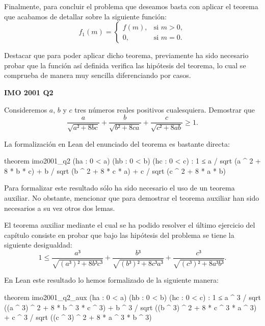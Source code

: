Finalmente, para concluir el problema que deseamos basta con aplicar el
teorema que acabamos de detallar sobre la siguiente función:
 \begin{equation}
    f_1(m)=\left\lbrace\begin{array}{ll}
                         f(m), & \text{si } m>0, \\
                         0, & \text{si } m=0.
                       \end{array}\right.
\end{equation}

Destacar que para poder aplicar dicho teorema, previamente ha sido
necesario probar que la función así definida verifica las hipótesis del
teorema, lo cual se comprueba de manera muy sencilla diferenciando por
casos.

\textbf{IMO 2001 Q2}

\noindent
Consideremos \(a\), \(b\) y \(c\) tres números reales positivos
cualesquiera. Demostrar que
\begin{equation}\label{introq2}
  \frac{a}{\sqrt{a²+8bc}} +
  \frac{b}{\sqrt{b²+8ca}} +
  \frac{c}{\sqrt{c²+8ab}} ≥ 1.
\end{equation}

La formalización en Lean del enunciado del teorema es bastante directa:

\begin{leancode}
theorem imo2001_q2
  (ha : 0 < a)
  (hb : 0 < b)
  (hc : 0 < c)
  : 1 ≤ a / sqrt (a ^ 2 + 8 * b * c) +
        b / sqrt (b ^ 2 + 8 * c * a) +
        c / sqrt (c ^ 2 + 8 * a * b)
\end{leancode}

Para formalizar este resultado sólo ha sido necesario el uso de un
teorema auxiliar. No obstante, mencionar que para demostrar el teorema
auxiliar han sido necesarios a su vez otros dos lemas.

El teorema auxiliar mediante el cual se ha podido resolver el último
ejercicio del capítulo consiste en probar que bajo las hipótesis del
problema se tiene la siguiente desigualdad:
\begin{equation}\label{introteoraux}
   1 ≤ \frac{a³}{\sqrt{(a³)²+8b³c³}}+\frac{b³}{\sqrt{(b³)²+8c³a³}}+
    \frac{c³}{\sqrt{(c³)²+8a³b³}}.
\end{equation}

En Lean este resultado lo hemos formalizado de la siguiente manera:
\begin{leancode}
theorem imo2001_q2_aux
  (ha : 0 < a)
  (hb : 0 < b)
  (hc : 0 < c)
  : 1 ≤ a ^ 3 / sqrt ((a ^ 3) ^ 2 + 8 * b ^ 3 * c ^ 3) +
        b ^ 3 / sqrt ((b ^ 3) ^ 2 + 8 * c ^ 3 * a ^ 3) +
        c ^ 3 / sqrt ((c ^ 3) ^ 2 + 8 * a ^ 3 * b ^ 3)
\end{leancode}


